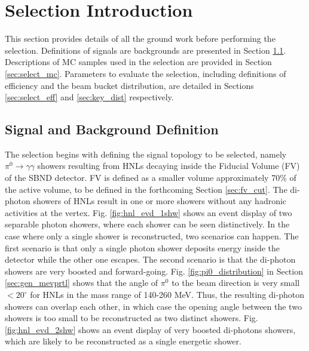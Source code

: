 
\section{Selection Introduction}
\label{sec:select_intro}

This section provides details of all the ground work before performing the selection. 
Definitions of signals are backgrounds are presented in Section \ref{sec:sig_bkg_def}.
Descriptions of MC samples used in the selection are provided in Section \ref{sec:select_mc}.
Parameters to evaluate the selection, including definitions of efficiency and the beam bucket distribution, are detailed in Sections \ref{sec:select_eff} and \ref{sec:key_dist} respectively.

\subsection{Signal and Background Definition}
\label{sec:sig_bkg_def}

The selection begins with defining the signal topology to be selected, namely $\pi^0 \rightarrow \gamma\gamma$ showers resulting from HNLs decaying inside the Fiducial Volume (FV) of the SBND detector.
FV is defined as a smaller volume approximately 70\% of the active volume, to be defined in the forthcoming Section \ref{sec:fv_cut}.
The di-photon showers of HNLs result in one or more showers without any hadronic activities at the vertex.
Fig. \ref{fig:hnl_evd_1shw} shows an event display of two separable photon showers, where each shower can be seen distinctively.
In the case where only a single shower is reconstructed, two scenarios can happen.
The first scenario is that only a single photon shower deposits energy inside the detector while the other one escapes.
The second scenario is that the di-photon showers are very boosted and forward-going.
Fig. \ref{fig:pi0_distribution} in Section \ref{sec:gen_mevprtl} shows that the angle of $\pi^0$ to the beam direction is very small $< 20^\circ$ for HNLs in the mass range of 140-260 MeV.
Thus, the resulting di-photon showers can overlap each other, in which case the opening angle between the two showers is too small to be reconstructed as two distinct showers. 
Fig. \ref{fig:hnl_evd_2shw} shows an event display of very boosted di-photons showers, which are likely to be reconstructed as a single energetic shower.

